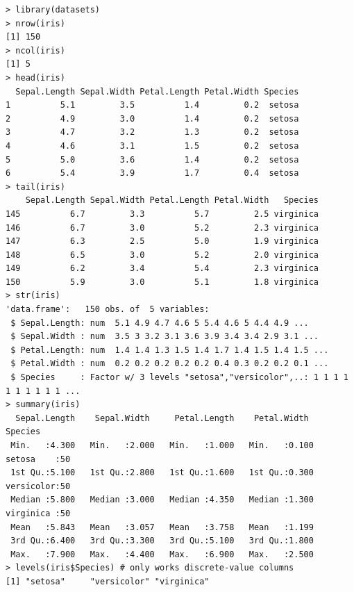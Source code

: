 \begin{lstlisting}
> library(datasets)
> nrow(iris)
[1] 150
> ncol(iris)
[1] 5
> head(iris)
  Sepal.Length Sepal.Width Petal.Length Petal.Width Species
1          5.1         3.5          1.4         0.2  setosa
2          4.9         3.0          1.4         0.2  setosa
3          4.7         3.2          1.3         0.2  setosa
4          4.6         3.1          1.5         0.2  setosa
5          5.0         3.6          1.4         0.2  setosa
6          5.4         3.9          1.7         0.4  setosa
> tail(iris)
    Sepal.Length Sepal.Width Petal.Length Petal.Width   Species
145          6.7         3.3          5.7         2.5 virginica
146          6.7         3.0          5.2         2.3 virginica
147          6.3         2.5          5.0         1.9 virginica
148          6.5         3.0          5.2         2.0 virginica
149          6.2         3.4          5.4         2.3 virginica
150          5.9         3.0          5.1         1.8 virginica
> str(iris)
'data.frame':	150 obs. of  5 variables:
 $ Sepal.Length: num  5.1 4.9 4.7 4.6 5 5.4 4.6 5 4.4 4.9 ...
 $ Sepal.Width : num  3.5 3 3.2 3.1 3.6 3.9 3.4 3.4 2.9 3.1 ...
 $ Petal.Length: num  1.4 1.4 1.3 1.5 1.4 1.7 1.4 1.5 1.4 1.5 ...
 $ Petal.Width : num  0.2 0.2 0.2 0.2 0.2 0.4 0.3 0.2 0.2 0.1 ...
 $ Species     : Factor w/ 3 levels "setosa","versicolor",..: 1 1 1 1 1 1 1 1 1 1 ...
> summary(iris)
  Sepal.Length    Sepal.Width     Petal.Length    Petal.Width          Species
 Min.   :4.300   Min.   :2.000   Min.   :1.000   Min.   :0.100   setosa    :50
 1st Qu.:5.100   1st Qu.:2.800   1st Qu.:1.600   1st Qu.:0.300   versicolor:50
 Median :5.800   Median :3.000   Median :4.350   Median :1.300   virginica :50
 Mean   :5.843   Mean   :3.057   Mean   :3.758   Mean   :1.199
 3rd Qu.:6.400   3rd Qu.:3.300   3rd Qu.:5.100   3rd Qu.:1.800
 Max.   :7.900   Max.   :4.400   Max.   :6.900   Max.   :2.500
> levels(iris$Species) # only works discrete-value columns
[1] "setosa"     "versicolor" "virginica"
\end{lstlisting}

